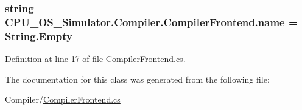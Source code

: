\subsubsection[{name}]{\setlength{\rightskip}{0pt plus 5cm}string C\+P\+U\+\_\+\+O\+S\+\_\+\+Simulator.\+Compiler.\+Compiler\+Frontend.\+name = String.\+Empty\hspace{0.3cm}{\ttfamily [private]}}\label{class_c_p_u___o_s___simulator_1_1_compiler_1_1_compiler_frontend_a2b4facf897341f61d4db60dc7fdc67c4}


Definition at line 17 of file Compiler\+Frontend.\+cs.



The documentation for this class was generated from the following file\+:\begin{DoxyCompactItemize}
\item 
Compiler/\hyperlink{_compiler_frontend_8cs}{Compiler\+Frontend.\+cs}\end{DoxyCompactItemize}

